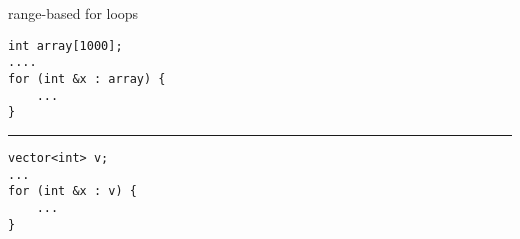 \begin{frame}[fragile,label=rangeFor]{range-based for loops}
\lstset{language=C++,style=small}
\begin{lstlisting}
int array[1000];
....
for (int &x : array) {
    ...
}
\end{lstlisting}
\hrule
\begin{lstlisting}
vector<int> v;
...
for (int &x : v) {
    ...
}
\end{lstlisting}
\end{frame}
